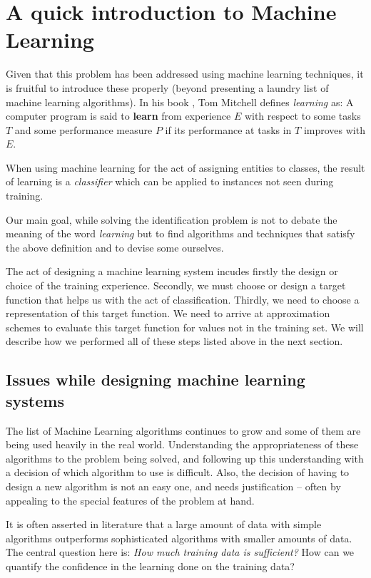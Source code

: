\section{A quick introduction to Machine Learning}

Given that this problem has been addressed using machine learning techniques,
it is fruitful to introduce these properly (beyond presenting a laundry list
of machine learning algorithms). In his book \cite{mitchell1997machine}, Tom Mitchell defines \emph{learning} as:
A computer program is said to {\bf learn} from experience $E$ with
respect to some tasks $T$ and some performance measure $P$ if its
performance at tasks in $T$ improves with $E$.

When using machine learning for the act of assigning entities to classes,
the result of learning is a \emph{classifier} which can be 
applied to instances not seen during training.

Our main goal, while solving the identification problem is not to
debate the meaning of the word \emph{learning} but to find algorithms
and techniques that satisfy the above definition and to devise some
ourselves.

The act of designing a machine learning system incudes firstly the
design or choice of the training experience. Secondly, we must choose
or design a target function that helps us with the act of classification.
Thirdly, we need to choose a representation of this target function. 
We need to arrive at approximation schemes to evaluate this target function
for values not in the training set. We will describe how we performed
all of  these steps listed above in the next section.

\subsection{Issues while designing machine learning systems}
The list of Machine Learning algorithms continues to grow and some of
them are being used heavily in the real world.  Understanding the
appropriateness of these algorithms to the problem being solved, and
following up this understanding with a decision of which algorithm to use
is difficult.  Also, the decision of having to design a new algorithm is
not an easy one, and needs justification -- often by appealing to 
the special features of the problem at hand.

It is often asserted in literature that a large amount of data with
simple algorithms outperforms sophisticated algorithms with smaller
amounts of data.  The central question here is: \emph{How much
  training data is sufficient?} How can we quantify the confidence 
in the learning done on the training data?

